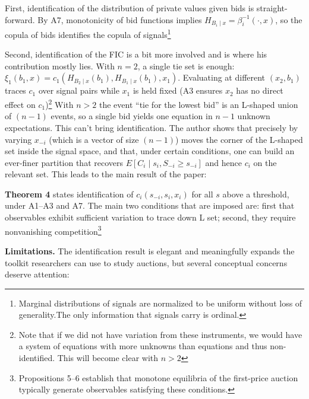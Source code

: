 \documentclass{article}
\begin{document}
First, identification of the distribution of private values given bids is straight-forward. By A7, monotonicity of bid functions implies $H_{B_i\mid x}=\beta_i^{-1}(\cdot,x)$, so the copula of bids identifies the copula of signals\footnote{ Marginal distributions of signals are normalized to be uniform without loss of generality.The only information that signals carry is ordinal.}

Second, identification of the FIC is a bit more involved and is where his contribution mostly lies. With $n=2$, a single tie set is enough: $\xi_1(b_1,x)=c_1(H_{B_2\mid x}(b_1), H_{B_1\mid x}(b_1), x_1)$. Evaluating at different $(x_2, b_1)$ traces $c_1$ over signal pairs while $x_1$ is held fixed (A3 ensures $x_2$ has no direct effect on $c_1$)\footnote{Note that if we did not have variation from these instruments, we would have a system of equations with more unknowns than equations and thus non-identified. This will become clear with $n>2$}
With $n>2$ the event ``tie for the lowest bid'' is an L-shaped union of $(n-1)$ events, so a single bid yields one equation in $n-1$ unknown expectations. This can't bring identification. The author shows that precisely by varying $x_{-i}$ (which is a vector of size $(n-1)$) moves the corner of the L-shaped set inside the signal space, and that, under certain conditions, one can build an ever-finer partition that recovers $E[C_i\mid s_i, S_{-i}\ge s_{-i}]$ and hence $c_i$ on the relevant set. This leads to the main result of the paper:

\textbf{Theorem 4} states identification of $c_i(s_{-i},s_i,x_i)$ for all $s$ above a threshold, under A1--A3 and A7. The main two conditions that are imposed are: first that observables exhibit sufficient variation to trace down L set; second, they require nonvanishing competition\footnote{Propositions 5--6 establish that monotone equilibria of the first-price auction typically generate observables satisfying these conditions.}

\textbf{Limitations.} The identification result is elegant and meaningfully expands the toolkit researchers can use to study auctions, but several conceptual concerns deserve attention:
\end{document}
